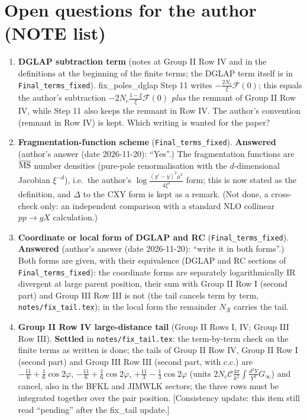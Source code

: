 {\color{red}
\section{Open questions for the author (NOTE list)}
\begin{enumerate}
\item \textbf{DGLAP subtraction term} (notes at Group II Row IV and in the definitions at the beginning of the finite terms; the DGLAP term itself is in \texttt{Final\_terms\_fixed}). fix\_poles\_dglap Step 11 writes $-\frac{2N_{c}}{\xi}\mathcal{F}(0)$; this equals the author's subtraction $-2N_{c}\frac{1-\xi}{\xi}\mathcal{F}(0)$ \emph{plus} the remnant of Group II Row IV, while Step 11 also keeps the remnant in Row IV. The author's convention (remnant in Row IV) is kept. Which writing is wanted for the paper?
\item \textbf{Fragmentation-function scheme} (\texttt{Final\_terms\_fixed}). \textbf{Answered} (author's answer (date 2026-11-20): ``Yes''.) The fragmentation functions are $\overline{\rm MS}$ number densities (pure-pole renormalisation with the $d$-dimensional Jacobian $\xi^{-d}$), i.e.\ the author's $\log\frac{(y'-y)^{2}\mu^{2}}{4\xi^{2}}$ form; this is now stated as the definition, and $\Delta$ to the CXY form is kept as a remark. (Not done, a cross-check only: an independent comparison with a standard NLO collinear $pp\to gX$ calculation.)
\item \textbf{Coordinate or local form of DGLAP and RC} (\texttt{Final\_terms\_fixed}). \textbf{Answered} (author's answer (date 2026-11-20): ``write it in both forms''.) Both forms are given, with their equivalence (DGLAP and RC sections of \texttt{Final\_terms\_fixed}): the coordinate forms are separately logarithmically IR divergent at large parent position, their sum with Group II Row I (second part) and Group III Row III is not (the tail cancels term by term, \texttt{notes/fix\_tail.tex}); in the local form the remainder $N_{\mathcal{R}}$ carries the tail.
\item \textbf{Group II Row IV large-distance tail} (Group II Rows I, IV; Group III Row III). \textbf{Settled} in \texttt{notes/fix\_tail.tex}: the term-by-term check on the finite terms as written is done; the tails of Group II Row IV, Group II Row I (second part) and Group III Row III (second part, with c.c.) are $-\frac{11}{6}+\frac16\cos2\varphi$, $-\frac{11}{6}+\frac16\cos2\varphi$, $+\frac{11}{3}-\frac13\cos2\varphi$ (units $2N_{c}\mathcal{C}\frac{4\pi}{k^{2}}\int\frac{d^{2}Y}{Y^{2}}G_{\infty}$) and cancel, also in the BFKL and JIMWLK sectors; the three rows must be integrated together over the pair position. [Consistency update: this item still read ``pending'' after the fix\_tail update.]

\end{enumerate}}
